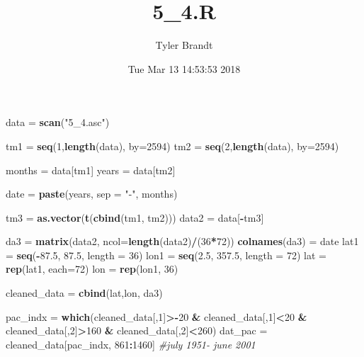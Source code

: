 \documentclass[]{article}
\title{5\_4.R}
\author{Tyler Brandt}
\date{Tue Mar 13 14:53:53 2018}
\newenvironment{Shaded}{\begin{snugshade}}{\end{snugshade}}
\newcommand{\KeywordTok}[1]{\textcolor[rgb]{0.13,0.29,0.53}{\textbf{#1}}}
\newcommand{\DataTypeTok}[1]{\textcolor[rgb]{0.13,0.29,0.53}{#1}}
\newcommand{\DecValTok}[1]{\textcolor[rgb]{0.00,0.00,0.81}{#1}}
\newcommand{\FloatTok}[1]{\textcolor[rgb]{0.00,0.00,0.81}{#1}}
\newcommand{\StringTok}[1]{\textcolor[rgb]{0.31,0.60,0.02}{#1}}
\newcommand{\CommentTok}[1]{\textcolor[rgb]{0.56,0.35,0.01}{\textit{#1}}}
\newcommand{\OperatorTok}[1]{\textcolor[rgb]{0.81,0.36,0.00}{\textbf{#1}}}
\newcommand{\NormalTok}[1]{#1}
\begin{document}
\maketitle

\begin{Shaded}
\begin{Highlighting}[]
\NormalTok{data =}\StringTok{ }\KeywordTok{scan}\NormalTok{(}\StringTok{"5_4.asc"}\NormalTok{)}

\NormalTok{tm1 =}\StringTok{ }\KeywordTok{seq}\NormalTok{(}\DecValTok{1}\NormalTok{,}\KeywordTok{length}\NormalTok{(data), }\DataTypeTok{by=}\DecValTok{2594}\NormalTok{)}
\NormalTok{tm2 =}\StringTok{ }\KeywordTok{seq}\NormalTok{(}\DecValTok{2}\NormalTok{,}\KeywordTok{length}\NormalTok{(data), }\DataTypeTok{by=}\DecValTok{2594}\NormalTok{)}

\NormalTok{months =}\StringTok{ }\NormalTok{data[tm1]}
\NormalTok{years =}\StringTok{ }\NormalTok{data[tm2]}

\NormalTok{date =}\StringTok{ }\KeywordTok{paste}\NormalTok{(years, }\DataTypeTok{sep =} \StringTok{"-"}\NormalTok{, months)}

\NormalTok{tm3 =}\StringTok{ }\KeywordTok{as.vector}\NormalTok{(}\KeywordTok{t}\NormalTok{(}\KeywordTok{cbind}\NormalTok{(tm1, tm2)))}
\NormalTok{data2 =}\StringTok{ }\NormalTok{data[}\OperatorTok{-}\NormalTok{tm3]}

\NormalTok{da3 =}\StringTok{ }\KeywordTok{matrix}\NormalTok{(data2, }\DataTypeTok{ncol=}\KeywordTok{length}\NormalTok{(data2)}\OperatorTok{/}\NormalTok{(}\DecValTok{36}\OperatorTok{*}\DecValTok{72}\NormalTok{))}
\KeywordTok{colnames}\NormalTok{(da3) =}\StringTok{ }\NormalTok{date}
\NormalTok{lat1 =}\StringTok{ }\KeywordTok{seq}\NormalTok{(}\OperatorTok{-}\FloatTok{87.5}\NormalTok{, }\FloatTok{87.5}\NormalTok{, }\DataTypeTok{length =} \DecValTok{36}\NormalTok{)}
\NormalTok{lon1 =}\StringTok{ }\KeywordTok{seq}\NormalTok{(}\FloatTok{2.5}\NormalTok{, }\FloatTok{357.5}\NormalTok{, }\DataTypeTok{length =} \DecValTok{72}\NormalTok{)}
\NormalTok{lat =}\StringTok{ }\KeywordTok{rep}\NormalTok{(lat1, }\DataTypeTok{each=}\DecValTok{72}\NormalTok{)}
\NormalTok{lon =}\StringTok{ }\KeywordTok{rep}\NormalTok{(lon1, }\DecValTok{36}\NormalTok{)}

\NormalTok{cleaned_data =}\StringTok{ }\KeywordTok{cbind}\NormalTok{(lat,lon, da3)}

\NormalTok{pac_indx =}\StringTok{ }\KeywordTok{which}\NormalTok{(cleaned_data[,}\DecValTok{1}\NormalTok{]}\OperatorTok{>-}\DecValTok{20} \OperatorTok{&}\StringTok{ }\NormalTok{cleaned_data[,}\DecValTok{1}\NormalTok{]}\OperatorTok{<}\DecValTok{20} \OperatorTok{&}\StringTok{ }\NormalTok{cleaned_data[,}\DecValTok{2}\NormalTok{]}\OperatorTok{>}\DecValTok{160} \OperatorTok{&}\StringTok{ }\NormalTok{cleaned_data[,}\DecValTok{2}\NormalTok{]}\OperatorTok{<}\DecValTok{260}\NormalTok{)}
\NormalTok{dat_pac =}\StringTok{ }\NormalTok{cleaned_data[pac_indx, }\DecValTok{861}\OperatorTok{:}\DecValTok{1460}\NormalTok{] }\CommentTok{#july 1951- june 2001}


\end{Highlighting}
\end{Shaded}
\end{document}
